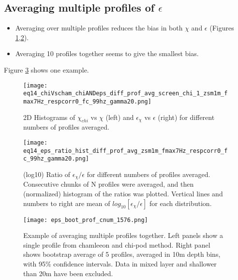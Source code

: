 \documentclass[11pt]{article}
\begin{document}
\clearpage
\subsection{Averaging multiple profiles of $\epsilon$}


\begin{itemize}

\item Averaging over multiple profiles reduces the bias in both $\chi$ and $\epsilon$ (Figures \ref{2Dhistdiffprof},\ref{histdiffprof}).

\item Averaging 10 profiles together seems to give the smallest bias.

\end{itemize}


Figure \ref{prof_avg_ex} shows one example. 


\begin{figure}[htbp]
\texttt{[image: eq14\_chiVscham\_chiANDeps\_diff\_prof\_avg\_screen\_chi\_1\_zsm1m\_fmax7Hz\_respcorr0\_fc\_99hz\_gamma20.png]}
\caption{2D Histograms of $\chi_{chi}$ vs $\chi$ (left) and $\epsilon_{\chi}$ vs $\epsilon$ (right) for different numbers of profiles averaged. }
\label{2Dhistdiffprof}
\end{figure}


\begin{figure}[htbp]
\texttt{[image: eq14\_eps\_ratio\_hist\_diff\_prof\_avg\_zsm1m\_fmax7Hz\_respcorr0\_fc\_99hz\_gamma20.png]}
\caption{(log10) Ratio of $\epsilon_{\chi}/\epsilon$ for different numbers of profiles averaged. Consecutive chunks of N profiles were averaged, and then (normalized) histogram of the ratios was plotted. Vertical lines and numbers to right are mean of $log_{10}[\epsilon_{\chi}/\epsilon]$ for each distribution. }
\label{histdiffprof}
\end{figure}


\begin{figure}[htbp]
\texttt{[image: eps\_boot\_prof\_cnum\_1576.png]}
\caption{Example of averaging multiple profiles together. Left panels show a single profile from chamleeon and chi-pod method. Right panel shows bootstrap average of 5 profiles, averaged in 10m depth bins, with 95\% confidence intervals. Data in mixed layer and shallower than 20m have been excluded.}
\label{prof_avg_ex}
\end{figure}
\end{document}
